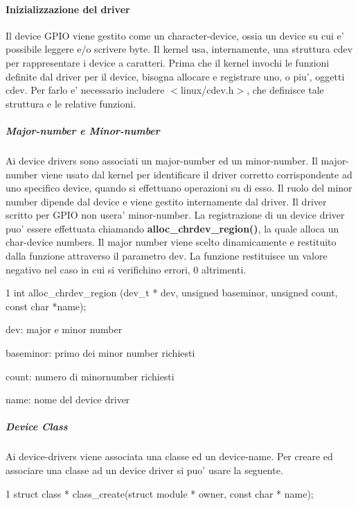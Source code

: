 \paragraph*{Inizializzazione del driver}

Il device G\+P\+I\+O viene gestito come un character-\/device, ossia un device su cui e' possibile leggere e/o scrivere byte. Il kernel usa, internamente, una struttura cdev per rappresentare i device a caratteri. Prima che il kernel invochi le funzioni definite dal driver per il device, bisogna allocare e registrare uno, o piu', oggetti cdev. Per farlo e' necessario includere $<$linux/cdev.\+h$>$, che definisce tale struttura e le relative funzioni. \subparagraph*{Major-\/number e Minor-\/number}

Ai device drivers sono associati un major-\/number ed un minor-\/number. Il major-\/number viene usato dal kernel per identificare il driver corretto corrispondente ad uno specifico device, quando si effettuano operazioni su di esso. Il ruolo del minor number dipende dal device e viene gestito internamente dal driver. Il driver scritto per G\+P\+I\+O non usera' minor-\/number. La registrazione di un device driver puo' essere effettuata chiamando {\bfseries alloc\+\_\+chrdev\+\_\+region()}, la quale alloca un char-\/device numbers. Il major number viene scelto dinamicamente e restituito dalla funzione attraverso il parametro dev. La funzione restituisce un valore negativo nel caso in cui si verifichino errori, 0 altrimenti. 
\begin{DoxyCode}
1 int alloc\_chrdev\_region (dev\_t * dev, unsigned baseminor, unsigned count, const char *name);
\end{DoxyCode}

\begin{DoxyItemize}
\item dev\+: major e minor number
\item baseminor\+: primo dei minor number richiesti
\item count\+: numero di minornumber richiesti
\item name\+: nome del device driver
\end{DoxyItemize}

\subparagraph*{Device Class}

Ai device-\/drivers viene associata una classe ed un device-\/name. Per creare ed associare una classe ad un device driver si puo' usare la seguente. 
\begin{DoxyCode}
1 struct class * class\_create(struct module * owner, const char * name);
\end{DoxyCode}

